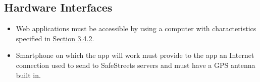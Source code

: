 \documentclass[../../../rasd.tex]{subfiles}
\begin{document}
\subsection{Hardware Interfaces\label{sect:3.1.2}}
	\begin{itemize}
\item Web applications must be accessible by  using a computer with characteristics specified in \hyperref[sect:3.4.2]{Section 3.4.2}. 
\item Smartphone on which the app will work must provide to the app an Internet connection used to send  to SafeStreets servers and must have a GPS antenna built in. 

\end{itemize}
\end{document}
